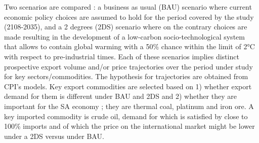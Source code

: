 \documentclass[12pt,english]{article}
\begin{document}
Two scenarios are compared : a business as usual (BAU) scenario where current economic policy choices are assumed to hold for the period covered by the study (2108-2035), %
and a 2 degrees (2DS) scenario where on the contrary choices are made resulting in the development of a low-carbon socio-technological system that allows to contain %
global warming with a 50\% chance within the limit of 2°C with respect to pre-industrial times. Each of these scenarios implies distinct prospective export volume and/or price trajectories over the period under study for key sectors/commodities. The hypothesis for trajectories are obtained from CPI's models. Key export commodities are selected based on 1) whether export demand for them is different under BAU and 2DS and 2) whether they are important for the SA economy ; they are thermal coal, platinum and iron ore. A key imported commodity is crude oil, demand for which is satisfied by close to 100\% imports and of which the price on the international market might be lower under a 2DS versus under BAU. 

\end{document}
